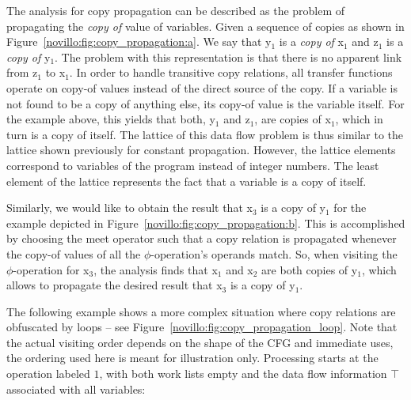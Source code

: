 The analysis for copy propagation can be described as the problem of
propagating the \textit{copy of} value of variables.  Given a sequence of
copies as shown in Figure~\ref{novillo:fig:copy_propagation:a}. We say that
y$_1$ is a \textit{copy of} x$_1$ and z$_1$ is a \textit{copy of} y$_1$.  The
problem with this representation is that there is no apparent link from z$_1$ to
x$_1$.  In order to handle transitive copy relations, all transfer functions
operate on copy-of values instead of the direct source of the copy.  If a
variable is not found to be a copy of anything else, its copy-of value is the
variable itself. For the example above, this yields that both, y$_1$ and z$_1$,
are copies of x$_1$, which in turn is a copy of itself. The lattice of this data
flow problem is thus similar to the lattice shown previously for constant
propagation. However, the lattice elements correspond to variables of the
program instead of integer numbers. The least element of the lattice
represents the fact that a variable is a copy of itself.

Similarly, we would like to obtain the result that x$_3$ is a copy of y$_1$ for
the example depicted in Figure~\ref{novillo:fig:copy_propagation:b}. This is
accomplished by choosing the meet operator such that a copy relation is
propagated whenever the copy-of values of all the $\phi$-operation's operands
match. So, when visiting the $\phi$-operation for x$_3$, the analysis finds
that x$_1$ and x$_2$ are both copies of y$_1$, which allows to propagate the
desired result that x$_3$ is a copy of y$_1$.

The following example shows a more complex situation where copy relations are
obfuscated by loops -- see Figure~\ref{novillo:fig:copy_propagation_loop}.  Note
that the actual visiting order depends on the shape of the CFG and immediate
uses, the ordering used here is meant for illustration only. Processing starts
at the operation labeled $1$, with both work lists empty and the data flow
information $\top$ associated with all variables:


